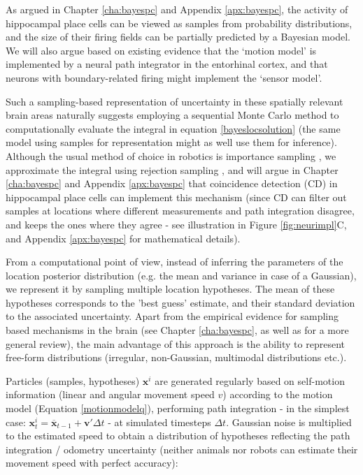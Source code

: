 As argued in Chapter \ref{cha:bayespc} and Appendix \ref{apx:bayespc}, the activity of hippocampal place cells can be viewed as samples from probability distributions, and the size of their firing fields can be partially predicted by a Bayesian model. We will also argue based on existing evidence that the `motion model' is implemented by a neural path integrator in the entorhinal cortex, and that neurons with boundary-related firing might implement the `sensor model'.

Such a sampling-based representation of uncertainty in these spatially relevant brain areas naturally suggests employing a sequential Monte Carlo method \citep{doucet2000sequential} to computationally evaluate the integral in equation \ref{bayeslocsolution} (the same model using samples for representation might as well use them for inference). Although the usual method of choice in robotics is importance sampling \citep{montemerlo2007fastslam, thrun2005probabilistic}, we approximate the integral using rejection sampling \citep{doucet2000sequential}, and will argue in Chapter \ref{cha:bayespc} and Appendix \ref{apx:bayespc} that coincidence detection (CD) in hippocampal place cells can implement this mechanism (since CD can filter out samples at locations where different measurements and path integration disagree, and keeps the ones where they agree - see illustration in Figure \ref{fig:neurimpl}C, and Appendix \ref{apx:bayespc} for mathematical details). 

From a computational point of view, instead of inferring the parameters of the location posterior distribution (e.g. the mean and variance in case of a Gaussian), we represent it by sampling multiple location hypotheses. The mean of these hypotheses corresponds to the 'best guess' estimate, and their standard deviation to the associated uncertainty. Apart from the empirical evidence for sampling based mechanisms in the brain (see Chapter \ref{cha:bayespc}, as well as \citep{fiser2010statistically} for a more general review), the main advantage of this approach is the ability to represent free-form distributions (irregular, non-Gaussian, multimodal distributions etc.).

Particles (samples, hypotheses) $\bm x^i$ are generated regularly based on self-motion information (linear and angular movement speed $v$) according to the motion model (Equation \ref{motionmodelq}), performing path integration - in the simplest case: $ \bm x_{t}^i = \overline{\bm x}_{t-1} + \bm v'\Delta t $ - at simulated timesteps $ \Delta t $. Gaussian noise is multiplied to the estimated speed to obtain a distribution of hypotheses reflecting the path integration / odometry uncertainty (neither animals nor robots can estimate their movement speed with perfect accuracy):

